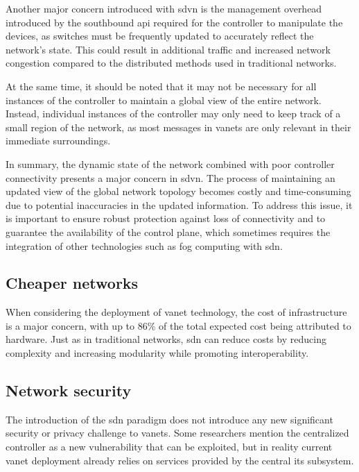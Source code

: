 Another major concern introduced with \gls{sdvn} is the management overhead introduced by the southbound \gls{api} required for the controller to manipulate the devices, as switches must be frequently updated to accurately reflect the network's state. This could result in additional traffic and increased network congestion compared to the distributed methods used in traditional networks.

At the same time, it should be noted that it may not be necessary for all instances of the controller to maintain a global view of the entire network. Instead, individual instances of the controller may only need to keep track of a small region of the network, as most messages in \glspl{vanet} are only relevant in their immediate surroundings\cite{sarpong_potential_2023}.

In summary, the dynamic state of the network combined with poor controller connectivity presents a major concern in \gls{sdvn}. The process of maintaining an updated view of the global network topology becomes costly and time-consuming due to potential inaccuracies in the updated information\cite{ben_jaballah_security_2020}. To address this issue, it is important to ensure robust protection against loss of connectivity and to guarantee the availability of the control plane, which sometimes requires the integration of other technologies such as fog computing with \gls{sdn}\cite{ben_jaballah_security_2020}.

\subsection{Cheaper networks}

When considering the deployment of \gls{vanet} technology, the cost of infrastructure is a major concern, with up to 86\% of the total expected cost being attributed to hardware\cite{asselin-miller_study_2016}. Just as in traditional networks, \gls{sdn} can reduce costs by reducing complexity and increasing modularity while promoting interoperability.

\subsection{Network security}

The introduction of the \gls{sdn} paradigm does not introduce any new significant security or privacy challenge to \glspl{vanet}. Some researchers\cite{ben_jaballah_security_2020} mention the centralized controller as a new vulnerability that can be exploited, but in reality current \gls{vanet} deployment already relies on services provided by the central \gls{its} subsystem.

